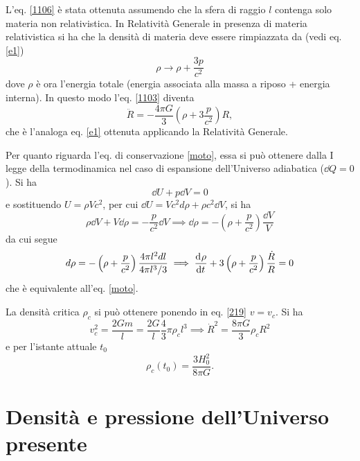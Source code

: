 L'eq. \eqref{1106} è stata ottenuta assumendo che la sfera di raggio $l$
contenga solo materia non relativistica.  In Relatività Generale in presenza di
materia relativistica si ha che la densità di materia deve essere rimpiazzata da
(vedi eq. \eqref{e1})
\begin{equation}
  \rho \to  \rho + \frac{3 p}{c^2}
\end{equation}
dove $\rho$ è ora l'energia totale (energia associata alla massa a riposo +
energia interna).  In questo modo l'eq. \eqref{1103} diventa
\begin{equation}
  \ddot R = - \frac{4 \pi G }{3} \left( \rho + 3 \frac{p}{c^2} \right) R,
\end{equation}
che è l'analoga eq. \eqref{e1} ottenuta applicando la Relatività Generale.

Per quanto riguarda l'eq. di conservazione \eqref{moto}, essa si può ottenere
dalla I legge della termodinamica nel caso di espansione dell'Universo
adiabatica ($\dd Q=0$).  Si ha
\begin{equation}
  \dd U + p \dd V=0
\end{equation}
e sostituendo $U=\rho V c^2$, per cui $\dd U= V c^2 d\rho + \rho c^2 \dd V$, si
ha
\begin{equation}
  \rho \dd V + V \dd\rho = - \frac{p}{c^2} \dd V \implies
  \dd\rho= -\left( \rho + \frac{p}{c^2} \right) \frac{\dd V}{V}
\end{equation}
da cui segue
\begin{equation}
  d\rho= - \left( \rho + \frac{p}{c^2} \right) \frac{4 \pi l^2 dl}{4 \pi l^3/3}
  \implies \frac{{\mathop{}\!\mathrm{d}^{}}\rho}{\mathop{}\!\mathrm{d} {t}^{}} +  3 \left( \rho + \frac{p}{c^2} \right) \frac{\dot
    R }{R} =0
\end{equation}
che è equivalente all'eq. \eqref{moto}.

La densità critica $\rho_c$ si può ottenere ponendo in eq. \eqref{219}
$v=v_{c}$.  Si ha
\begin{equation}
  v^2_{c} = \frac{2 G m }{l}=\frac{2G}{l} \frac{4}{3} \pi \rho_c l^3 \implies
  \dot{R}^2= \frac{8 \pi G}{3} \rho_c R^2
\end{equation}
e per l'istante attuale $t_0$
\begin{equation}
\rho_c(t_{0}) = \frac{3 H_0^2}{8 \pi G}.
\end{equation}

\section{Densità e pressione dell'Universo presente}

